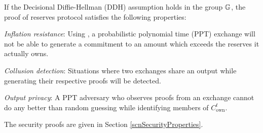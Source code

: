 If the Decisional Diffie-Hellman (DDH) assumption holds in the group $\mathbb{G}$, the \RPlus proof of reserves protocol satisfies the following properties:
\pointsStart
\item \textit{Inflation resistance}: Using \RBw, a probabilistic polynomial time (\textsf{PPT}) exchange will not be able to generate a commitment to an amount which exceeds the reserves it actually owns.%
\item \textit{Collusion detection}: Situations where two exchanges share an output while generating their respective \RPlus proofs will be detected.
\item \textit{Output privacy}: A \textsf{PPT} adversary who observes \RPlus proofs from an exchange cannot do any better than random guessing while identifying members of $C_{\text{own}}^t$.
\pointsEnd

The security proofs are given in Section \ref{scnSecurityProperties}.

